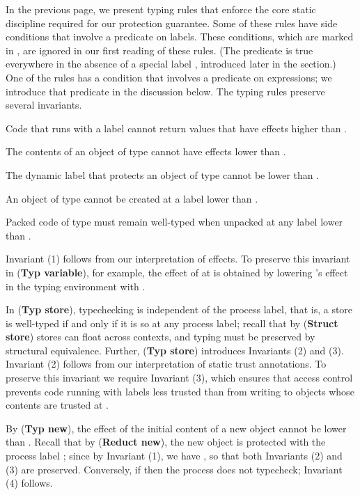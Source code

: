 \documentclass{sigplanconf}
\newcommand{\trule}[1]{(\textbf{Typ #1})}
\newcommand{\srule}[1]{\textbf{Struct #1}}
\newcommand{\rrule}[1]{\textbf{Reduct #1}}
\newcounter{compactenumc}
\newenvironment{compactenum3}
        {\begin{list}{(\arabic{compactenumc})}{
        \usecounter{compactenumc}
\setlength{\leftmargin}{6mm}
        \setlength{\labelwidth}{\leftmargin}
        }}
        {\end{list}}
\begin{document}
In the previous page, we present typing rules that enforce the core static discipline required for our protection guarantee. Some of these rules have side conditions that involve a predicate  on labels. These conditions, which are marked in , are ignored in our first reading of these rules. (The predicate  is true everywhere in the absence of a special label , introduced later in the section.) One of the rules has a condition that involves a predicate  on expressions; we introduce that predicate in the discussion below.
The typing rules preserve several invariants.
\begin{compactenum3}
\item Code that runs with a label  cannot return values that have effects higher than .
\item The contents of an object of type  cannot have effects lower than . 
\item The dynamic label that protects an object of type  cannot be lower than . 
\item An object of type  cannot be created at a label lower than . \item Packed code of type  must remain well-typed when unpacked at any label lower than .
\end{compactenum3}
Invariant (1) follows from our interpretation of effects. To preserve this invariant in \trule{variable}, for example, the effect of  at  is obtained by lowering 's effect in the typing environment with .


In \trule{store}, typechecking is independent of the process label, that is, a store is well-typed if and only if it is so at any process label; recall that by (\srule{store}) stores can float across contexts, and typing must be preserved by structural equivalence. Further, \trule{store} introduces Invariants (2) and (3). Invariant (2) follows from our interpretation of static trust annotations. To preserve this invariant we require Invariant (3), which ensures that access control prevents code running with labels less trusted than  from writing to objects whose contents are trusted at . 

By \trule{new}, the effect  of the initial content of a new object cannot be lower than . Recall that by (\rrule{new}), the new object is protected with the process label ; since  by Invariant (1), we have , so that both Invariants (2) and (3) are preserved. Conversely, if  then the process does not typecheck; Invariant (4) follows. 
\end{document}

